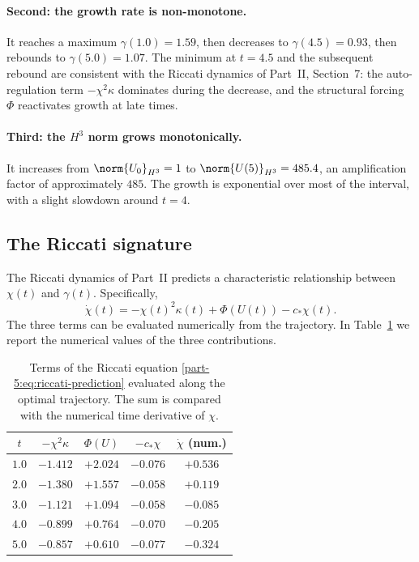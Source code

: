 \paragraph{Second: the growth rate is non-monotone.} It reaches a 
maximum $\gamma(1.0)=1.59$, then decreases to $\gamma(4.5)=0.93$, then 
rebounds to $\gamma(5.0)=1.07$. The minimum at $t=4.5$ and the 
subsequent rebound are consistent with the Riccati dynamics of 
Part~II, Section~7: the auto-regulation term $-\chi^2\kappa$ dominates 
during the decrease, and the structural forcing $\Phi$ reactivates 
growth at late times.

\paragraph{Third: the $H^3$ norm grows monotonically.} It increases 
from $\norm{U_0}_{H^3}=1$ to $\norm{U(5)}_{H^3}=485.4$, an 
amplification factor of approximately $485$. The growth is exponential 
over most of the interval, with a slight slowdown around $t=4$.

\subsection{The Riccati signature}
\label{part-5:ssec:riccati-signature}

The Riccati dynamics of Part~II predicts a characteristic relationship 
between $\chi(t)$ and $\gamma(t)$. Specifically, 
\begin{equation}\label{part-5:eq:riccati-prediction}
\dot\chi(t) = -\chi(t)^2\kappa(t) + \Phi(U(t)) - c_\ast\chi(t).
\end{equation}
The three terms can be evaluated numerically from the trajectory. In 
Table~\ref{part-5:tab:riccati-terms} we report the numerical values of the 
three contributions.

\begin{table}[h]
\centering
\caption{Terms of the Riccati equation \eqref{part-5:eq:riccati-prediction} 
evaluated along the optimal trajectory. The sum is compared with the 
numerical time derivative of $\chi$.}
\label{part-5:tab:riccati-terms}
\begin{tabular}{ccccc}
\toprule
$t$ & $-\chi^2\kappa$ & $\Phi(U)$ & $-c_\ast\chi$ & $\dot\chi$ (num.) \\
\midrule
$1.0$ & $-1.412$ & $+2.024$ & $-0.076$ & $+0.536$ \\
$2.0$ & $-1.380$ & $+1.557$ & $-0.058$ & $+0.119$ \\
$3.0$ & $-1.121$ & $+1.094$ & $-0.058$ & $-0.085$ \\
$4.0$ & $-0.899$ & $+0.764$ & $-0.070$ & $-0.205$ \\
$5.0$ & $-0.857$ & $+0.610$ & $-0.077$ & $-0.324$ \\
\bottomrule
\end{tabular}
\end{table}

